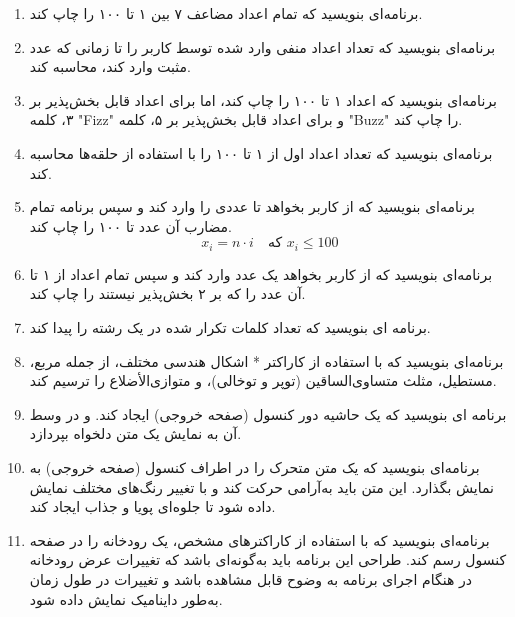 \documentclass[b5paper,12pt]{article}
\begin{document}
\begin{enumerate}
		\item برنامه‌ای بنویسید که تمام اعداد مضاعف ۷ بین ۱ تا ۱۰۰ را چاپ کند.
		
		\item برنامه‌ای بنویسید که تعداد اعداد منفی وارد شده توسط کاربر را تا زمانی که عدد مثبت وارد کند، محاسبه کند.
		
		\item برنامه‌ای بنویسید که اعداد ۱ تا ۱۰۰ را چاپ کند، اما برای اعداد قابل بخش‌پذیر بر ۳، کلمه "Fizz" و برای اعداد قابل بخش‌پذیر بر ۵، کلمه "Buzz" را چاپ کند.
		
		\item برنامه‌ای بنویسید که تعداد اعداد اول از ۱ تا ۱۰۰ را با استفاده از حلقه‌ها محاسبه کند.
		
		\item برنامه‌ای بنویسید که از کاربر بخواهد تا عددی را وارد کند و سپس برنامه تمام مضارب آن عدد تا ۱۰۰ را چاپ کند.
		\[
		x_i = n \cdot i \quad \text{که } x_i \leq 100
		\]
		
		\item برنامه‌ای بنویسید که از کاربر بخواهد یک عدد وارد کند و سپس تمام اعداد از ۱ تا آن عدد را که بر ۲ بخش‌پذیر نیستند را چاپ کند.

		\item برنامه ای بنویسید که تعداد کلمات تکرار شده در یک رشته را پیدا کند.
		
		\item برنامه‌ای بنویسید که با استفاده از کاراکتر * اشکال هندسی مختلف، از جمله مربع، مستطیل، مثلث متساوی‌الساقین (توپر و توخالی)، و متوازی‌الأضلاع را ترسیم کند.

		\item برنامه ای بنویسید که یک حاشیه دور کنسول (صفحه خروجی) ایجاد کند. و در وسط آن به نمایش یک متن دلخواه بپردازد.
	
		\item برنامه‌ای بنویسید که یک متن متحرک را در اطراف کنسول (صفحه خروجی) به نمایش بگذارد. این متن باید به‌آرامی حرکت کند و با تغییر رنگ‌های مختلف نمایش داده شود تا جلوه‌ای پویا و جذاب ایجاد کند.

		\item برنامه‌ای بنویسید که با استفاده از کاراکترهای مشخص، یک رودخانه را در صفحه کنسول رسم کند. طراحی این برنامه باید به‌گونه‌ای باشد که تغییرات عرض رودخانه در هنگام اجرای برنامه به وضوح قابل مشاهده باشد و تغییرات در طول زمان به‌طور داینامیک نمایش داده شود.
		
	\end{enumerate}
	
	
	
\end{document}
